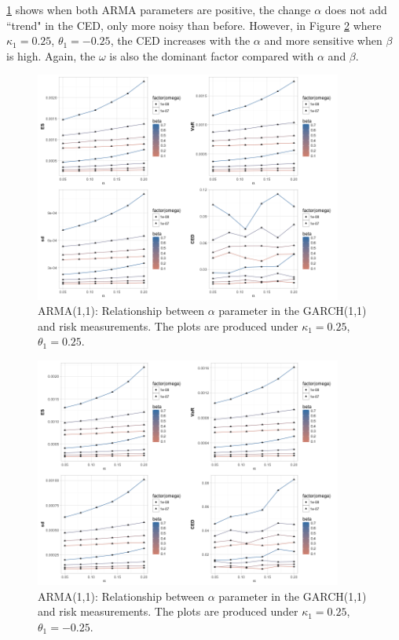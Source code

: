 \documentclass[11pt]{article}
\begin{document}
\ref{fig:garch_ARMA11_risk_measures_4_alpha} shows when both ARMA parameters are positive, the change $\alpha$ does not add ``trend" in the CED, only more noisy than before.  However, in Figure \ref{fig:garch_ARMA11_risk_measures_3_alpha} where $\kappa_1 = 0.25$, $\theta_1 = -0.25$, the CED increases with the $\alpha$ and more sensitive when $\beta$ is high. Again, the $\omega$ is also the dominant factor compared with $\alpha$ and $\beta$.

\begin{figure}[H]
\centering
\includegraphics[width = 0.9\textwidth]{../figures/simulation_garch/garch_ARMA11_risk_measures_4_alpha}
\caption{ARMA(1,1): Relationship between $\alpha$ parameter in the GARCH(1,1) and risk measurements. The plots are produced under $\kappa_1 = 0.25$, $\theta_1 = 0.25$. }
\label{fig:garch_ARMA11_risk_measures_4_alpha}
\end{figure}

\begin{figure}[H]
\centering
\includegraphics[width = 0.9\textwidth]{../figures/simulation_garch/garch_ARMA11_risk_measures_3_alpha}
\caption{ARMA(1,1): Relationship between $\alpha$ parameter in the GARCH(1,1) and risk measurements. The plots are produced under $\kappa_1 = 0.25$, $\theta_1 = -0.25$. }
\label{fig:garch_ARMA11_risk_measures_3_alpha}
\end{figure}
\end{document}
